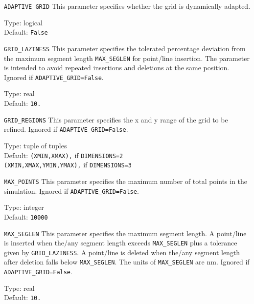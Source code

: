 \begin{keydescription}{\texttt{ADAPTIVE\_GRID}}
This parameter specifies whether the grid is dynamically adapted. 
\begin{keytab}
   Type:    \> logical \\
   Default: \> \texttt{False}
\end{keytab}
\end{keydescription}

\begin{keydescription}{\texttt{GRID\_LAZINESS}}
This parameter specifies the tolerated percentage deviation from the
maximum segment length \texttt{MAX\_SEGLEN} for point/line insertion. The
parameter is intended to avoid repeated insertions and deletions at the same position.
Ignored if \texttt{ADAPTIVE\_GRID=False}.
\begin{keytab}
   Type:    \> real \\
   Default: \> \texttt{10.}
\end{keytab}
\end{keydescription}

\begin{keydescription}{\texttt{GRID\_REGIONS}}
This parameter specifies the x and y range of the grid to be refined. Ignored 
if \texttt{ADAPTIVE\_GRID=False}.
\begin{keytab}
   Type:    \> tuple of tuples\\
   Default: \> \texttt{(XMIN,XMAX),} if \texttt{DIMENSIONS=2} \\
            \> \texttt{(XMIN,XMAX,YMIN,YMAX),} if \texttt{DIMENSIONS=3}
\end{keytab}
\end{keydescription}

\begin{keydescription}{\texttt{MAX\_POINTS}}
This parameter specifies the maximum number of total points in the simulation. 
Ignored if \texttt{ADAPTIVE\_GRID=False}. 
\begin{keytab}
   Type:    \> integer \\
   Default: \> \texttt{10000}
\end{keytab}
\end{keydescription}

\begin{keydescription}{\texttt{MAX\_SEGLEN}}
This parameter specifies the maximum segment length. A point/line is inserted
when the/any segment length exceeds \texttt{MAX\_SEGLEN} plus a tolerance given
by \texttt{GRID\_LAZINESS}. A point/line is deleted when the/any segment length
after deletion falls below \texttt{MAX\_SEGLEN}. The units of
\texttt{MAX\_SEGLEN} are nm. Ignored if \texttt{ADAPTIVE\_GRID=False}.
\begin{keytab}
   Type:    \> real \\
   Default: \> \texttt{10.}
\end{keytab}
\end{keydescription}

